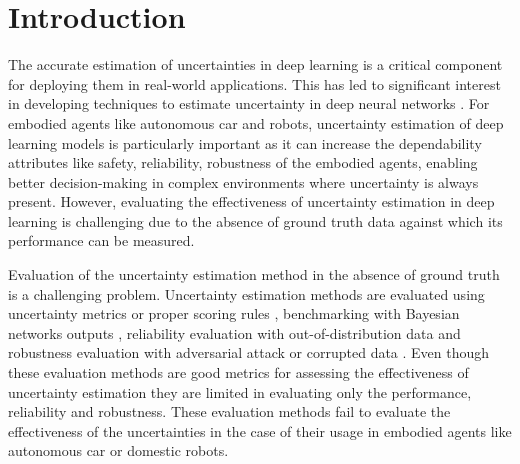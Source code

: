 
\hypertarget{sec:intro}{%
\section{Introduction}\label{sec:intro}}

The accurate estimation of uncertainties in deep learning is a critical
component for deploying them in real-world applications. This has led to
significant interest in developing techniques to estimate uncertainty in
deep neural networks \cite{mena2021survey} \cite{abdar2021review}. For embodied agents like autonomous
car and robots, uncertainty estimation of deep learning models is
particularly important as it can increase the dependability attributes
like safety, reliability, robustness of the embodied agents, enabling
better decision-making in complex environments where uncertainty is
always present. However, evaluating the effectiveness of uncertainty
estimation in deep learning is challenging due to the absence of ground
truth data against which its performance can be measured.

Evaluation of the uncertainty estimation method in the absence of ground
truth is a challenging problem. Uncertainty estimation methods are
evaluated using uncertainty metrics or proper scoring rules \cite{lakshminarayanan2017simple} \cite{gneiting2007strictly},
benchmarking with Bayesian networks outputs \cite{wilson2022evaluating}, reliability
evaluation with out-of-distribution data  \cite{sensoy2018evidential} \cite{kristiadi2021learnable} \cite{kristiadi2020being} and robustness
evaluation with adversarial attack\cite{sensoy2018evidential} \cite{van2020uncertainty} \cite{liu2020simple}  or corrupted data \cite{joppich2022classification} \cite{hendrycks2020augmix}. Even
though these evaluation methods are good metrics for assessing the
effectiveness of uncertainty estimation they are limited in evaluating
only the performance, reliability and robustness. These evaluation
methods fail to evaluate the effectiveness of the uncertainties in the
case of their usage in embodied agents like autonomous car or domestic robots.

